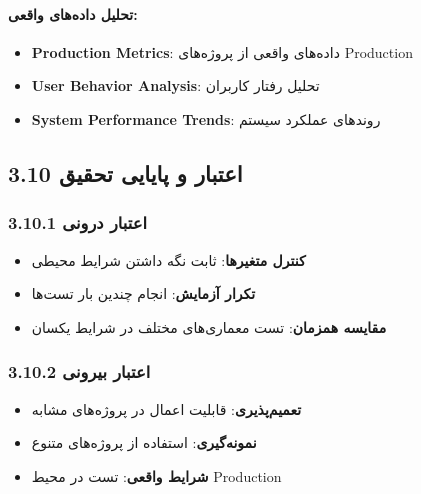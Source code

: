 \documentclass[
]{article}
\providecommand{\tightlist}{%
  \setlength{\itemsep}{0pt}\setlength{\parskip}{0pt}}
\begin{document}
\paragraph{تحلیل داده‌های
واقعی:}\label{ux62aux62dux644ux6ccux644-ux62fux627ux62fux647ux647ux627ux6cc-ux648ux627ux642ux639ux6cc}

\begin{itemize}
\tightlist
\item
  \textbf{Production Metrics}: داده‌های واقعی از پروژه‌های Production
\item
  \textbf{User Behavior Analysis}: تحلیل رفتار کاربران
\item
  \textbf{System Performance Trends}: روندهای عملکرد سیستم
\end{itemize}

\subsection{3.10 اعتبار و پایایی
تحقیق}\label{ux627ux639ux62aux628ux627ux631-ux648-ux67eux627ux6ccux627ux6ccux6cc-ux62aux62dux642ux6ccux642}

\subsubsection{3.10.1 اعتبار
درونی}\label{ux627ux639ux62aux628ux627ux631-ux62fux631ux648ux646ux6cc}

\begin{itemize}
\tightlist
\item
  \textbf{کنترل متغیرها}: ثابت نگه داشتن شرایط محیطی
\item
  \textbf{تکرار آزمایش}: انجام چندین بار تست‌ها
\item
  \textbf{مقایسه همزمان}: تست معماری‌های مختلف در شرایط یکسان
\end{itemize}

\subsubsection{3.10.2 اعتبار
بیرونی}\label{ux627ux639ux62aux628ux627ux631-ux628ux6ccux631ux648ux646ux6cc}

\begin{itemize}
\tightlist
\item
  \textbf{تعمیم‌پذیری}: قابلیت اعمال در پروژه‌های مشابه
\item
  \textbf{نمونه‌گیری}: استفاده از پروژه‌های متنوع
\item
  \textbf{شرایط واقعی}: تست در محیط Production
\end{itemize}
\end{document}
